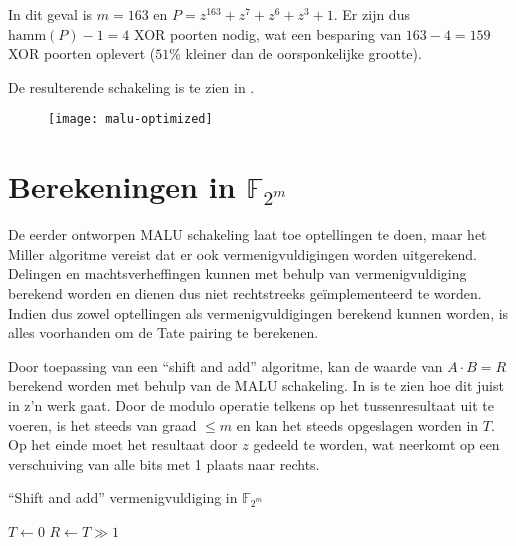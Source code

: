 In dit geval is $m = 163$ en $P = z^{163} + z^7 + z^6 + z^3 + 1$. Er zijn dus $\text{hamm}(P) - 1 = 4$ XOR poorten nodig, wat een besparing van $163 - 4 =  159$ XOR poorten oplevert ($51\%$ kleiner dan de oorsponkelijke grootte).

De resulterende schakeling is te zien in .

\begin{figure}[h]
	\begin{center}
		\texttt{[image: malu-optimized]}
		\label{figuur-implementatie-malu-optimized}
	\end{center}
\end{figure}

\section{Berekeningen in $\mathbb{F}_{2^m}$}\label{sectie-implementatie-gf2m}

De eerder ontworpen MALU schakeling laat toe optellingen te doen, maar het Miller algoritme vereist dat er ook vermenigvuldigingen worden uitgerekend. Delingen en machtsverheffingen kunnen met behulp van vermenigvuldiging berekend worden en dienen dus niet rechtstreeks ge\"implementeerd te worden. Indien dus zowel optellingen als vermenigvuldigingen berekend kunnen worden, is alles voorhanden om de Tate pairing te berekenen.

Door toepassing van een ``shift and add'' algoritme, kan de waarde van $A \cdot B = R$ berekend worden met behulp van de MALU schakeling. In  is te zien hoe dit juist in z'n werk gaat. Door de modulo operatie telkens op het tussenresultaat uit te voeren, is het steeds van graad $\leq m$ en kan het steeds opgeslagen worden in $T$. Op het einde moet het resultaat door $z$ gedeeld te worden, wat neerkomt op een verschuiving van alle bits met 1 plaats naar rechts.

\begin{algorithm}[h]
\dontprintsemicolon
\caption{``Shift and add'' vermenigvuldiging in $\mathbb{F}_{2^m}$}\label{algoritme-implementatie-gf2m-multiply}

$T \leftarrow 0$\;
$R \leftarrow T \gg 1$\;
\end{algorithm}


